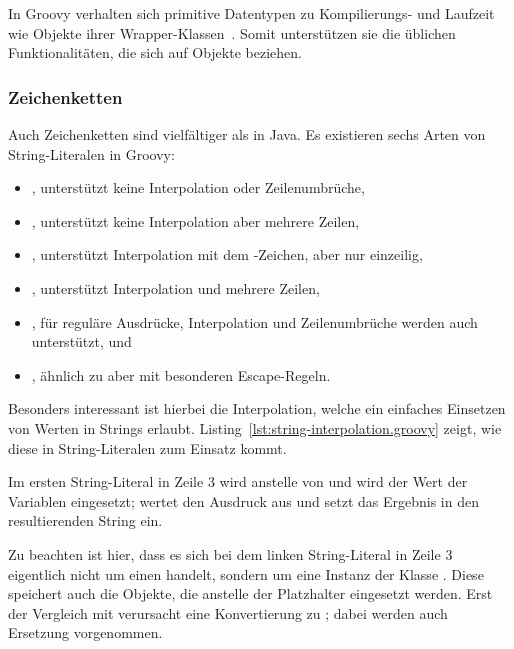 In Groovy verhalten sich primitive Datentypen zu Kompilierungs- und Laufzeit wie Objekte ihrer Wrapper-Klassen~\cite[{Abs.} 10.]{groovy-lang:differences}.
Somit unterstützen sie die üblichen Funktionalitäten, die sich auf Objekte beziehen.

\subsubsection{Zeichenketten}\label{subsubsec:strings}

Auch Zeichenketten sind vielfältiger als in Java.
Es existieren sechs Arten von String-Literalen in Groovy:

\begin{itemize}
\item {}, unterstützt keine Interpolation oder Zeilenumbrüche,
\item {}, unterstützt keine Interpolation aber mehrere Zeilen,
\item {}, unterstützt Interpolation mit dem \code{$}-Zeichen, aber nur einzeilig,
\item {}, unterstützt Interpolation und mehrere Zeilen,
\item {}, für reguläre Ausdrücke, Interpolation und Zeilenumbrüche werden auch unterstützt, und
\item {}, ähnlich zu  aber mit besonderen Escape-Regeln.
\end{itemize}

Besonders interessant ist hierbei die Interpolation, welche ein einfaches Einsetzen von Werten in Strings erlaubt.
Listing~\ref{lst:string-interpolation.groovy} zeigt, wie diese in String-Literalen zum Einsatz kommt.


Im ersten String-Literal in Zeile 3 wird anstelle von  und  wird der Wert der Variablen eingesetzt;
 wertet den Ausdruck  aus und setzt das Ergebnis in den resultierenden String ein.

Zu beachten ist hier, dass es sich bei dem linken String-Literal in Zeile 3 eigentlich nicht um einen  handelt, sondern um eine Instanz der Klasse .
Diese speichert auch die Objekte, die anstelle der Platzhalter eingesetzt werden.
Erst der Vergleich mit \code{==} verursacht eine Konvertierung zu ; dabei werden auch Ersetzung vorgenommen.

